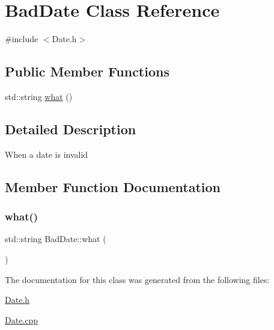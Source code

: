 \hypertarget{class_bad_date}{}\section{Bad\+Date Class Reference}
\label{class_bad_date}


{\ttfamily \#include $<$Date.\+h$>$}

\subsection*{Public Member Functions}
\begin{DoxyCompactItemize}
\item 
std\+::string \mbox{\hyperlink{class_bad_date_a50ea387c6301cf0279943fdc5a7db02d}{what}} ()
\end{DoxyCompactItemize}


\subsection{Detailed Description}
When a date is invalid 

\subsection{Member Function Documentation}
\mbox{\label{class_bad_date_a50ea387c6301cf0279943fdc5a7db02d}} 
\subsubsection{\texorpdfstring{what()}{what()}}
{\footnotesize\ttfamily std\+::string Bad\+Date\+::what (\begin{DoxyParamCaption}{ }\end{DoxyParamCaption})}



The documentation for this class was generated from the following files\+:\begin{DoxyCompactItemize}
\item 
\mbox{\hyperlink{_date_8h}{Date.\+h}}\item 
\mbox{\hyperlink{_date_8cpp}{Date.\+cpp}}\end{DoxyCompactItemize}
